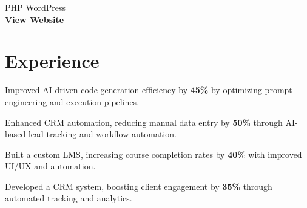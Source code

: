\documentclass[]{deedy-resume-openfont}
\begin{document}
\begin{minipage}[t]{0.33\textwidth}
    \vspace{6pt}  
    \textbullet{} PHP \textbullet{} WordPress \\  
    \href{http://classiccommercialfinance.com/}{\bf View Website}  




    \end{minipage} 
    \hfill
    \begin{minipage}[t]{0.66\textwidth} 


    \section{Experience}
    \vspace{1em} %

    \vspace{1em} %

    \vspace{1em} %
    \begin{tightemize}  
        \item Improved AI-driven code generation efficiency by \textbf{45\%} by optimizing prompt engineering and execution pipelines.  
        \item Enhanced CRM automation, reducing manual data entry by \textbf{50\%} through AI-based lead tracking and workflow automation.  
    \end{tightemize}  
    \vspace{0.5em}  
    

    \begin{tightemize}  
        \item Built a custom LMS, increasing course completion rates by \textbf{40\%} with improved UI/UX and automation.  
        \item Developed a CRM system, boosting client engagement by \textbf{35\%} through automated tracking and analytics.  
    \end{tightemize}  
    \sectionsep  
    



\end{minipage}
\end{document}
